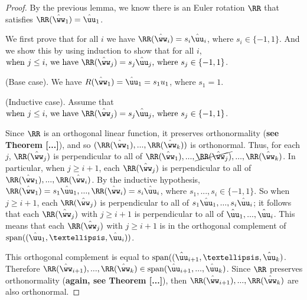 \begin{proof}
    By the previous lemma, we know there is an Euler rotation $\RR$ that satisfies $\RR(\hww_1) = \huu_1$. 
    
    We first prove that for all $i$ we have $\RR(\hww_i) = s_i \huu_i$, where $s_i \in \{-1, 1\}$. And we show this by using induction to show that for all $i$, $\text{when $j \leq i$, we have $\RR(\hww_j) = s_j \huu_j$, where $s_j \in \{-1, 1\}$}$.

    (Base case). We have $R(\hww_1) = \huu_1 = s_1 u_1$, where $s_1 = 1$.

    (Inductive case). Assume that $\text{when $j \leq i$, we have $\RR(\hww_j) = s_j \huu_j$, where $s_j \in \{-1, 1\}$}$.

    Since $\RR$ is an orthogonal linear function, it preserves orthonormality (\textbf{see Theorem [...]}), and so $(\RR(\hww_1), ..., \RR(\hww_k))$ is orthonormal. Thus, for each $j$, $\RR(\hww_j)$ is perpendicular to all of $\RR(\hww_1), ..., \cancel{\RR(\hww_j)}, ..., \RR(\hww_k)$. In particular, when $j \geq i + 1$, each $\RR(\hww_j)$ is perpendicular to all of $\RR(\hww_1), ..., \RR(\hww_i)$. By the inductive hypothesis, $\RR(\hww_1) = s_1 \huu_1, ..., \RR(\hww_i) = s_i \huu_i$, where $s_1, ..., s_i \in \{-1, 1\}$. So when $j \geq i + 1$, each $\RR(\hww_j)$ is perpendicular to all of $s_1 \huu_1, ..., s_i \huu_i$; it follows that each $\RR(\hww_j)$ with $j \geq i + 1$ is perpendicular to all of $\huu_1, ..., \huu_i$. This means that each $\RR(\hww_j)$ with $j \geq i + 1$ is in the orthogonal complement of $\spann((\huu_1, …, \huu_i))$.
    
    This orthogonal complement is equal to $\spann((\huu_{i + 1}, …, \huu_k)$. Therefore $\RR(\hww_{i + 1}), ..., \RR(\hww_k) \in \spann(\huu_{i + 1}, ..., \huu_k)$. Since $\RR$ preserves orthonormality (\textbf{again, see Theorem [...]}), then $\RR(\hww_{i + 1}), ..., \RR(\hww_k)$ are also orthonormal.
    

\end{proof}
